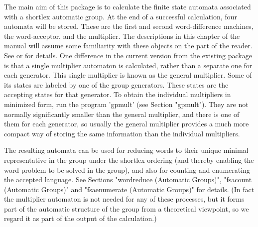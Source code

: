 
The main aim of this package is to calculate the finite state automata
associated with a shortlex automatic group. At the end of a
successful calculation, four automata will be stored. These are the first
and second word-difference machines, the word-acceptor, and the multiplier.
The descriptions in this  chapter of the manual will assume some familiarity
with these objects on the part of the reader.
See \cite{EHR91} or \cite{Holt94} for details. One difference in the
current version from the existing {\Automata} package
is that a single multiplier automaton is calculated,
rather than a separate one for each generator.
This single multiplier is known as the general multiplier. Some of its states
are labeled by one of the group generators. These states are the accepting
states for that generator. To obtain the individual multipliers in minimized
form, run the program 'gpmult' (see Section "gpmult"). They are not normally
significantly smaller than the general multiplier, and there is one of them
for each generator, so usually the general multiplier provides a much more
compact way of storing the same information than the individual multipliers.

The resulting automata
can be used for reducing words to their unique minimal representative in
the group under the shortlex ordering (and thereby enabling the
word-problem to be solved in the group), and also for counting and
enumerating the accepted language.
See Sections "wordreduce (Automatic Groups)", "fsacount (Automatic Groups)"
and "fsaenumerate (Automatic Groups)" for details.
(In fact the multiplier automaton is not needed for any of these processes,
but it forms part of the automatic structure of the group from a
theoretical viewpoint, so we regard it as part of the output of the
calculation.)

